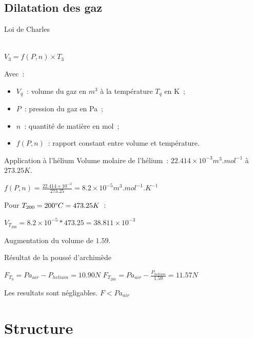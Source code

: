 \documentclass{beamer}
\begin{document}
\subsection{Dilatation des gaz}

\begin{frame}{Loi de Charles}
  \begin{center}
     \\
    $\displaystyle{V_3 = f(P, n) \times T_3}$
  \end{center}
  Avec~:
  \begin{itemize}
    \item $V_q$~: volume du gaz en $m^3$ à la température $T_q$ en K~;
    \item $P$~: pression du gaz en Pa~;
    \item $n$~: quantité de matière en mol~;
    \item $f(P, n)$~: rapport constant entre volume et température.
  \end{itemize}
\end{frame}

\begin{frame}{Application à l'hélium}
  Volume molaire de l'hélium~: $22.414\times 10^{-3} m^3.mol^{-1}$ à $273.25K$.
  \begin{center}
    $\displaystyle{f(P, n) = \frac{22.414\times 10^{-3}}{273.25} = 8.2\times 10^{-5} m^3.mol^{-1}.K^{-1}}$
  \end{center}
  Pour $T_{200} = 200 \degree C = 473.25 K$~:
  \begin{center}
    $\displaystyle{V_{T_{200}} = 8.2\times 10^{-5} * 473.25 = 38.811 \times 10^{-3}}$
  \end{center}
  Augmentation du volume de $1.59$.
\end{frame}

\begin{frame}{Résultat de la poussé d'archimède}
  \begin{center}
    $\displaystyle{F_{T_0} = Pa_{air} - P_{helium} = 10.90 N}$
    \bigbreak
    $\displaystyle{F_{T_{200}} = Pa_{air} - \frac{P_{helium}}{1.59} = 11.57 N}$ \\
  \end{center}
  Les resultats sont négligables. $F < Pa_{air}$
\end{frame}

\section{Structure}
\end{document}
